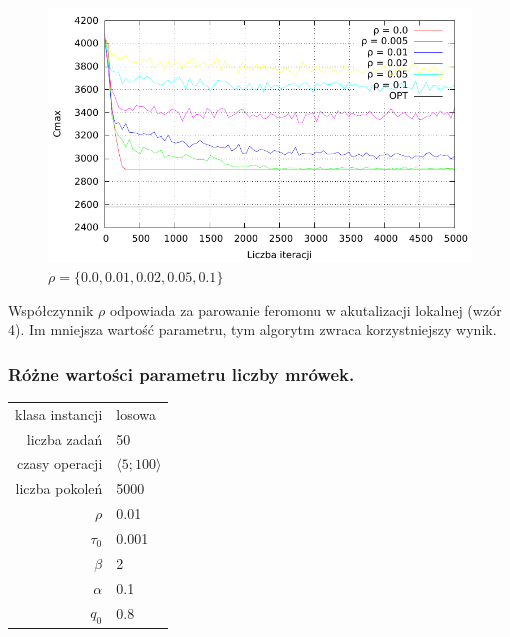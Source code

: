 \documentclass[10pt,a4paper]{article}
\begin{document}
\begin{figure}[h]
    \centering
    \includegraphics{./figures/inst_01_rnd_evapor_smooth.pdf}
    \caption{$ \rho = \{ 0.0, 0.01, 0.02, 0.05, 0.1 \} $}
\end{figure}
\vspace{15mm}
Współczynnik $\rho$ odpowiada za parowanie feromonu w akutalizacji lokalnej (wzór 4).
Im mniejsza wartość parametru, tym algorytm zwraca korzystniejszy wynik.


\newpage
\subsubsection{Różne wartości parametru liczby mrówek.}
\vspace{6 mm}
\begin{center}
\begin{tabular}{|r|l|}
  \hline
  klasa instancji & losowa \\
  liczba zadań & 50 \\
  czasy operacji & $ \langle 5;100 \rangle $  \\
  liczba pokoleń & 5000 \\
  $ \rho $ & 0.01 \\
  $ \tau_0 $ & 0.001 \\
  $ \beta $ & 2 \\
  $ \alpha $ & 0.1 \\
  $ q_0 $ & 0.8 \\
  \hline
\end{tabular}
\end{center}
\end{document}
